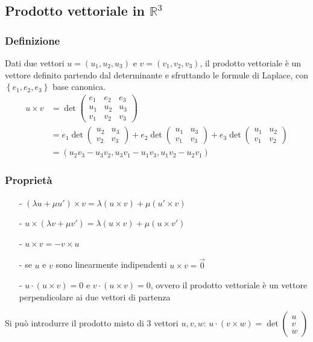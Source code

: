 \documentclass[a4paper]{article}
\begin{document}
\newpage

\subsection{Prodotto vettoriale in \(\mathbb{R}^3\)}
\subsubsection*{Definizione}
Dati due vettori \(u = (u_1, u_2, u_3)\) e \(v = (v_1, v_2, v_3)\), il prodotto vettoriale è un vettore definito partendo dal
determinante e sfruttando le formule di Laplace, con \(\left\{ e_1, e_2, e_3 \right\}\) base canonica.
\begin{align*}
	u \times v &= \det \left( \begin{matrix} e_1 & e_2 & e_3 \\ u_1 & u_2 & u_3 \\ v_1 & v_2 & v_3 \end{matrix} \right) \\
	&= e_1 \det \left( \begin{matrix} u_2 & u_3 \\ v_2 & v_3 \end{matrix} \right) + e_2 \det \left( \begin{matrix} u_1 & u_3 \\ v_1 & v_3 \end{matrix} \right) + e_3 \det \left( \begin{matrix} u_1 & u_2 \\ v_1 & v_2 \end{matrix} \right) \\
	&= \left( u_2 v_3 - u_3 v_2, u_3 v_1 - u_1 v_3, u_1 v_2 - u_2 v_1 \right)
\end{align*}

\subsubsection*{Proprietà}
\begin{itemize}[topsep=3pt, itemsep=0pt]
	\item[-] \((\lambda u + \mu u') \times v = \lambda (u \times v) + \mu (u' \times v)\)
	\item[-] \(u \times (\lambda v + \mu v') = \lambda (u \times v) + \mu (u \times v')\)
	\item[-] \(u \times v = - v \times u\)
	\item[-] se \(u\) e \(v\) sono linearmente indipendenti \(u \times v = \vec{0}\)
	\item[-] \(u \cdot (u \times v) = 0\) e \(v \cdot (u \times v) = 0\), ovvero il prodotto vettoriale è un vettore perpendicolare
	ai due vettori di partenza
\end{itemize}
Si può introdurre il prodotto misto di 3 vettori \(u, v, w\): \(u \cdot (v \times w) = \det \left( \begin{matrix} u \\ v \\ w \end{matrix} \right)\)
\end{document}
